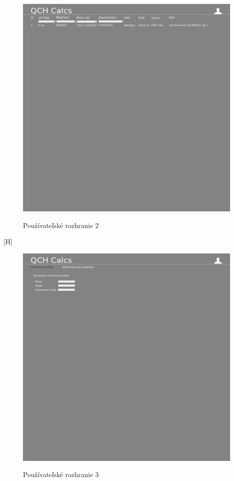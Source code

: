 \documentclass[12pt,a4paper]{article}
\begin{document}
\begin{figure}[H]
	\caption{Používateľské rozhranie 2}
	\includegraphics[width=\textwidth]{dizajn-2}
	\label{fig:ui2}
\end{figure}[H]

\begin{figure}[H]
	\caption{Používateľské rozhranie 3}
	\includegraphics[width=\textwidth]{dizajn-3}
	\label{fig:ui3}
\end{figure}
\end{document}
